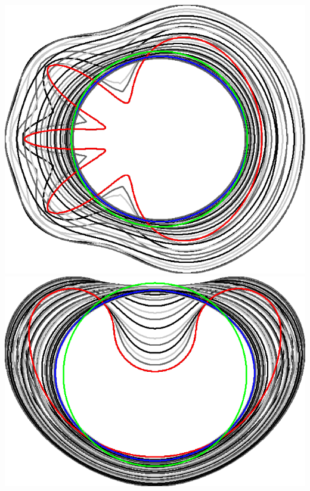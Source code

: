 \begin{frame}
\begin{minipage}{0.25\textwidth}
\includegraphics[scale=0.06]{figures/graphcut/with-neighborhood-flow/radius_16/flower.png}\\[1em]
\includegraphics[scale=0.06]{figures/graphcut/with-neighborhood-flow/radius_16/bean.png}
\end{minipage}%
%
%
\begin{minipage}{0.74\textwidth}
\center

\end{minipage}
\end{frame}
